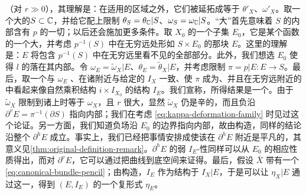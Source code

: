 （对 $r\gg 0$），其理解是：在\trTrivialization{}适用的区域之外，它们被延拓成等于 $\theta'_X$、$\omega'_X$。取一个大的\trDisk{}$S\subset\mathbb{C}$，并给它配上限制 $\theta_S=\theta_{\mathbb{C}}|S$、$\omega_S=\omega_{\mathbb{C}}|S$。“大”首先意味着 $S$ 的内部含有 $p$ 的一切\trCriticalValue；以后还会施加更多条件。取 $X_0$ 的一个\trCompact{}子集 $E_0$，它是某个\trPlurisubharmonic{}函数的一个大\trSublevelSet，并考虑 $p^{-1}(S)$ 中在无穷远处形如 $S\times E_0$ 的那块 $E$。这里的理解是：$E$ 将包含 $p^{-1}(S)$ 中在无穷远\trTrivialization{}里看不见的全部部分。此外，我们想选 $E_0$ 使得 $l$ 的\trSupport{}落在其内部。令 $\omega_E=\tilde{\omega}_X|E$、$\theta_E=\tilde{\theta}_X|E$，并考虑限制 $\pi=p|E\colon E\to S$。最后，取一个与 $\omega_E$ \trCompatible、在诸\trCriticalPoint{}附近与给定的 $I_X$ 一致、使 $\pi$ 成为\trPseudoholomorphic、并且在无穷远附近的\trTrivialization{}中看起来像自然乘积结构 $i\times I_{X_0}$ 的\trAlmostComplex{}结构 $I_E$。我们宣称，所得结果是一个\trExact\trLefschetzFibration。由于 $\tilde{\omega}_X$ 限制到诸\trFiber{}上时等于 $\omega_X$，且 $r$ 很大，显然 $\tilde{\omega}_X$ 仍是辛的，而且负\trLiouville\trVectorField{}沿 $\partial^v E=\pi^{-1}(\partial S)$ 指向内部；我们在考虑 \eqref{eq:kappa-deformation-family} 时见过这个论证。另一方面，我们知道负\trLiouville{}场沿 $E_0$ 的边界指向内部，故由构造，同样的结论沿整个 $\partial^h E$ 成立。事实上，我们已经把事情安排成使该\trFibration{}在 $\partial^h E$ 附近是平凡的，其意义见\cref{thm:original-definition-remark}。$\partial^h E$ 的弱 $I_E$-\trConvex{}性同样可以从 $E_0$ 的相应性质得出，而对 $\partial^v E$，它可以通过把\trPseudoholomorphic{}曲线\trProjection{}到底空间来证得。最后，假设 $\bar{X}$ 带有一个\trIsomorphism{} \eqref{eq:canonical-bundle-pencil}；由构造，$I_E$ 作为\trAlmostComplex{}结构\trHomotopic{}于 $I_X|E$，于是可以让 $\eta_X|E$ 通过这一\trHomotopy，得到 $(E,I_E)$ 的一个复\trVolume{}形式 $\eta_E$。

